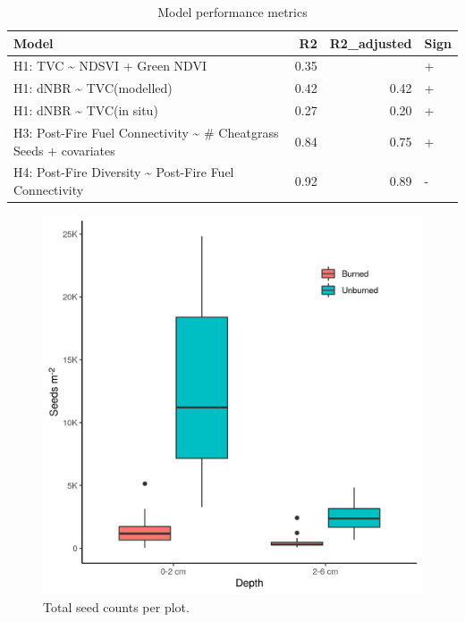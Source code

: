 \documentclass[
  11pt,
]{article}
\begin{document}
\begin{table}

\caption{\label{tab:unnamed-chunk-2}Model performance metrics}
\centering
\fontsize{8}{10}\selectfont
\begin{tabular}[t]{lrrl}
\toprule
Model & R2 & R2\_adjusted & Sign\\
\midrule
H1: TVC \textasciitilde{} NDSVI + Green NDVI & 0.35 &  & +\\
H1: dNBR \textasciitilde{} TVC(modelled) & 0.42 & 0.42 & +\\
H1: dNBR \textasciitilde{} TVC(in situ) & 0.27 & 0.20 & +\\
H3: Post-Fire Fuel Connectivity \textasciitilde{} \# Cheatgrass Seeds + covariates & 0.84 & 0.75 & +\\
H4: Post-Fire Diversity \textasciitilde{} Post-Fire Fuel Connectivity & 0.92 & 0.89 & -\\
\bottomrule
\end{tabular}
\end{table}

\begin{figure}
\centering
\includegraphics{images/depth_x_burned_counts.png}
\caption{Total seed counts per plot.}
\end{figure}
\end{document}

